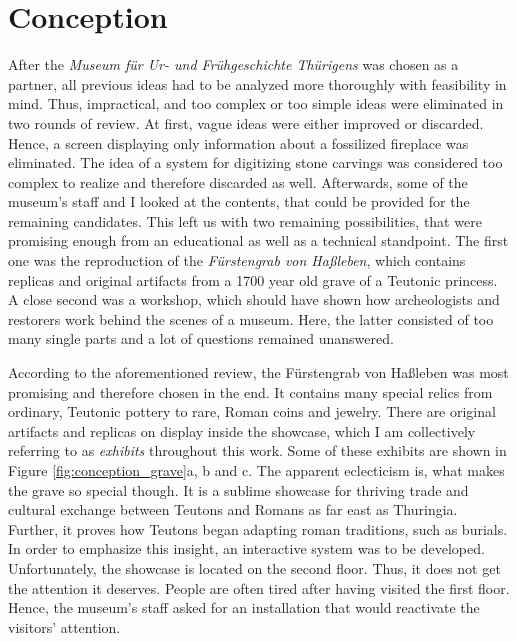 \chapter{Conception}
\label{conception}

After the \textit{Museum für Ur- und Frühgeschichte Thürigens} was chosen as a partner, all previous ideas had to be analyzed more thoroughly with feasibility in mind. Thus, impractical, and too complex or too simple ideas were eliminated in two rounds of review. At first, vague ideas were either improved or discarded. Hence, a screen displaying only information about a fossilized fireplace was eliminated. The idea of a system for digitizing stone carvings was considered too complex to realize and therefore discarded as well. Afterwards, some of the museum's staff and I looked at the contents, that could be provided for the remaining candidates. This left us with two remaining possibilities, that were promising enough from an educational as well as a technical standpoint. The first one was the reproduction of the \textit{Fürstengrab von Haßleben}, which contains replicas and original artifacts from a 1700 year old grave of a Teutonic princess. A close second was a workshop, which should have shown how archeologists and restorers work behind the scenes of a museum. Here, the latter consisted of too many single parts and a lot of questions remained unanswered.


According to the aforementioned review, the Fürstengrab von Haßleben was most promising and therefore chosen in the end. It contains many special relics from ordinary, Teutonic pottery to rare, Roman coins and jewelry. There are original artifacts and replicas on display inside the showcase, which I am collectively referring to as \textit{exhibits} throughout this work. Some of these exhibits are shown in Figure \ref{fig:conception_grave}a, b and c. The apparent eclecticism is, what makes the grave so special though. It is a sublime showcase for thriving trade and cultural exchange between Teutons and Romans as far east as Thuringia. Further, it proves how Teutons began adapting roman traditions, such as burials. In order to emphasize this insight, an interactive system was to be developed. Unfortunately, the showcase is located on the second floor. Thus, it does not get the attention it deserves. People are often tired after having visited the first floor. Hence, the museum's staff asked for an installation that would reactivate the visitors' attention.


